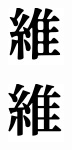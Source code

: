 \documentclass[12pt,twoside]{report}
\begin{document}
\begin{figure}[htbp]
    \begin{subfigure}[b]{0.1\linewidth}
        \includegraphics[width=\linewidth]{./figures/fonts/642_6.jpg}
        \caption{}
        \label{fig:fonts7}
    \end{subfigure}
    \hfill
    \begin{subfigure}[b]{0.1\linewidth}
        \includegraphics[width=\linewidth]{./figures/fonts/642_7.jpg}

\end{subfigure}
\end{figure}
\end{document}
